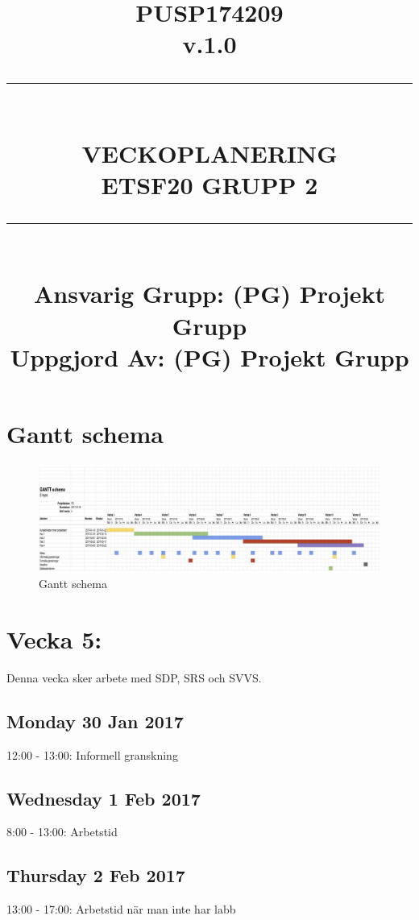 \documentclass[paper=a4, fontsize=11pt,twoside]{article}
\title{
		\documentNumber{#1}																						
		\documentVersion{#2}																				
		\HRule{0.5pt} \\ %
		\LARGE \textbf{\uppercase{#3}} \\
		\large \textbf{\uppercase{ETSF20 Grupp 2}} 
		\HRule{2pt} \\ [1.5cm]    
		\normalsize            
		\documentResponsible{#4} \\ 
		\documentCreator{#4}  
	}
\newcommand{\HRule}[1]{\rule{\linewidth}{#1}}
\newcommand{\documentNumber}[1]{\centering PUSP1742#1 \\[1.0cm]}
\newcommand{\documentVersion}[1]{\centering \small{v.#1} \\[1.0cm]}
\newcommand{\documentResponsible}[1]{\centering  Ansvarig Grupp: #1}
\newcommand{\documentCreator}[1]{\centering Uppgjord Av: #1}
\newcommand{\grouptitlepage}[4]{ 
	\title{
		\documentNumber{#1}																						
		\documentVersion{#2}																				
		\HRule{0.5pt} \\ %
		\LARGE \textbf{\uppercase{#3}} \\
		\large \textbf{\uppercase{ETSF20 Grupp 2}} 
		\HRule{2pt} \\ [1.5cm]    
		\normalsize            
		\documentResponsible{#4} \\ 
		\documentCreator{#4}  
	}																							
	\maketitle																							
	\thispagestyle{empty} 																					
	\newpage 
}
\begin{document}
\grouptitlepage
{09}
{1.0}
{Veckoplanering}
{(PG) Projekt Grupp}


\section{Gantt schema}
\begin{figure}[H]
\centering
\includegraphics[width = 17cm]{e-kyss-gantt.png} %
\caption{Gantt schema}
\end{figure}


\section*{Vecka 5:}
Denna vecka sker arbete med SDP, SRS och SVVS.\\
\subsection*{Monday 30 Jan 2017}
	12:00 - 13:00: Informell granskning\\
\subsection*{Wednesday 1 Feb 2017}
	8:00 - 13:00: Arbetstid\\
\subsection*{Thursday 2 Feb 2017}
	13:00 - 17:00: Arbetstid när man inte har labb\\
\end{document}
